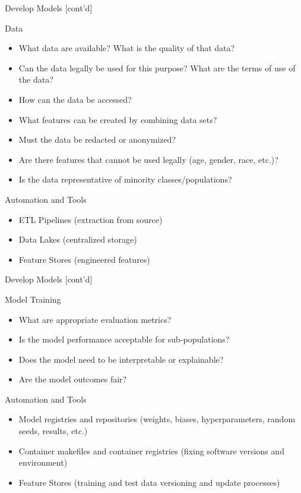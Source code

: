 \documentclass[ignorenonframetext,xcolor=x11names]{beamer}
\begin{document}
\begin{frame}{Develop Models \small [cont'd]}
\begin{block}{Data}
\begin{itemize}
   \item What data are available? What is the quality of that data?
   \item Can the data legally be used for this purpose? What are the terms of use of the data?
   \item How can the data be accessed?
   \item What features can be created by combining data sets?
   \item Must the data be redacted or anonymized?
   \item Are there features that cannot be used legally (age, gender, race, etc.)?
   \item Is the data representative of minority classes/populations?
\end{itemize}
\end{block}
\begin{block}{Automation and Tools}
\begin{itemize}
   \item ETL Pipelines (extraction from source)
   \item Data Lakes (centralized storage)
   \item Feature Stores (engineered features)
\end{itemize}
\end{block}
\end{frame}

\begin{frame}{Develop Models \small [cont'd]}
\begin{block}{Model Training}
\begin{itemize}
   \item What are appropriate evaluation metrics?
   \item Is the model performance acceptable for sub-populations?
   \item Does the model need to be interpretable or explainable?
   \item Are the model outcomes fair?
\end{itemize}
\end{block}
\begin{block}{Automation and Tools}
\begin{itemize}
   \item Model registries and repositories (weights, biases, hyperparameters, random seeds, results, etc.)
   \item Container makefiles and container registries (fixing software versions and environment)
   \item Feature Stores (training and test data versioning and update processes)
\end{itemize}
\end{block}
\end{frame}
\end{document}
